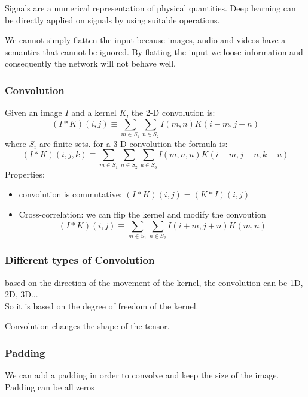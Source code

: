 Signals are a numerical representation of physical quantities. Deep learning can be directly applied on signals by using suitable operations.

We cannot simply flatten the input because images, audio and videos have a semantics that cannot be ignored. By flatting the input we loose information and consequently the network will not behave well.

\subsubsection{Convolution}
Given an image $I$ and a kernel $K$, the 2-D convolution is:
\begin{equation}
    (I*K)(i,j) \equiv \sum_{m \in S_{1}}\sum_{n \in S_{2}} I(m, n)K(i-m, j-n)
\end{equation}
where $S_{i}$ are finite sets.
for a 3-D convolution the formula is:
\begin{equation}
        (I*K)(i,j, k) \equiv \sum_{m \in S_{1}}\sum_{n \in S_{2}}\sum_{u \in S_{3}} I(m, n, u)K(i-m, j-n, k-u)
\end{equation}
Properties: 
\begin{itemize}
    \item convolution is commutative: $(I*K)(i, j) = (K*I)(i, j)$
    \item Cross-correlation: we can flip the kernel and modify the convoution
    \begin{equation}
        (I*K)(i,j) \equiv \sum_{m \in S_{1}}\sum_{n \in S_{2}} I(i+m, j+n)K(m, n)
    \end{equation}
\end{itemize}

\subsubsection{Different types of Convolution}
based on the direction of the movement of the kernel, the convolution can be 1D, 2D, 3D...\\
So it is based on the degree of freedom of the kernel.

Convolution changes the shape of the tensor.

\subsubsection{Padding}
We can add a padding in order to convolve and keep the size of the image. Padding can be all zeros

